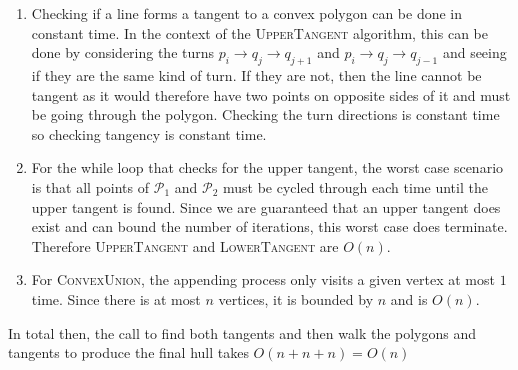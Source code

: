 \documentclass{eeleyes}
\begin{document}
\begin{enumerate}
    \item Checking if a line forms a tangent to a convex polygon can be done in constant time. In the context of the \textsc{UpperTangent} algorithm, this can be done by considering the turns $p_i \to q_j \to q_{j+1}$ and $p_i \to q_j \to q_{j-1}$ and seeing if they are the same kind of turn. If they are not, then the line cannot be tangent as it would therefore have two points on opposite sides of it and must be going through the polygon. Checking the turn directions is constant time so checking tangency is constant time.
    \item For the while loop that checks for the upper tangent, the worst case scenario is that all points of $\mathcal{P}_1$ and $\mathcal{P}_2$ must be cycled through each time until the upper tangent is found. Since we are guaranteed that an upper tangent does exist and can bound the number of iterations, this worst case does terminate. Therefore \textsc{UpperTangent} and \textsc{LowerTangent} are $O(n)$.
    \item For \textsc{ConvexUnion}, the appending process only visits a given vertex at most $1$ time. Since there is at most $n$ vertices, it is bounded by $n$ and is $O(n)$.
\end{enumerate}

\noindent
In total then, the call to find both tangents and then walk the polygons and tangents to produce the final hull takes $O(n + n + n) = O(n)$
\end{document}
